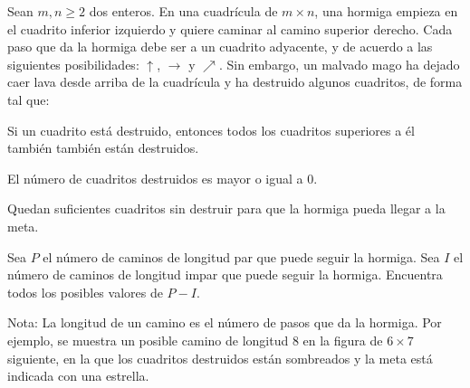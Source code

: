 Sean $m,n\geq 2$ dos enteros. En una cuadrícula de $m\times n$, una hormiga empieza en el cuadrito inferior izquierdo y quiere caminar al camino superior derecho. Cada paso que da la hormiga debe ser a un cuadrito adyacente, y de acuerdo a las siguientes posibilidades: $\uparrow$, $\rightarrow$ y $\nearrow$. Sin embargo, un malvado mago ha dejado caer lava desde arriba de la cuadrícula y ha destruido algunos cuadritos, de forma tal que:

Si un cuadrito está destruido, entonces todos los cuadritos superiores a él también también están destruidos.

El número de cuadritos destruidos es mayor o igual a $0$.

Quedan suficientes cuadritos sin destruir para que la hormiga pueda llegar a la meta. 

Sea $P$ el número de caminos de longitud par que puede seguir la hormiga. Sea $I$ el número de caminos de longitud impar que puede seguir la hormiga. Encuentra todos los posibles valores de $P-I$.

Nota: La longitud de un camino es el número de pasos que da la hormiga. Por ejemplo, se muestra un posible camino de longitud $8$ en la figura de $6\times 7$ siguiente, en la que los cuadritos destruidos están sombreados y la meta está indicada con una estrella.